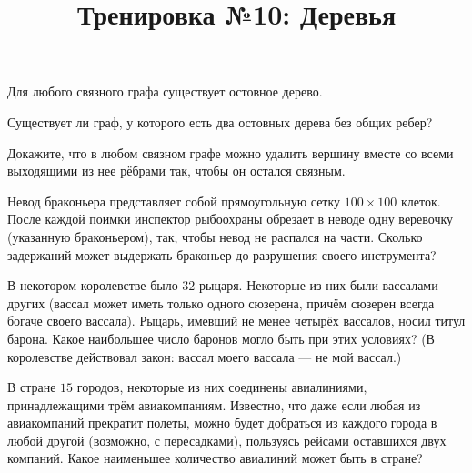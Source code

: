 



\title{Тренировка №10: Деревья}
\maketitle

\begin{problem}
	Для любого связного графа существует остовное дерево.
\end{problem}

\begin{problem}
	Существует ли граф, у которого есть два остовных дерева без общих ребер?
\end{problem}

\begin{problem}
	Докажите, что в любом связном графе можно удалить вершину вместе со всеми выходящими из нее рёбрами так, чтобы он остался связным.
\end{problem}

\begin{problem}
	Невод браконьера представляет собой прямоугольную сетку $100 \times 100$ клеток. После каждой поимки инспектор рыбоохраны обрезает в неводе одну веревочку (указанную браконьером), так, чтобы невод не распался на части. Сколько задержаний может выдержать браконьер до разрушения своего инструмента?
\end{problem}

\begin{problem}
	В некотором королевстве было $32$ рыцаря. Некоторые из них были вассалами других (вассал может иметь только одного сюзерена, причём сюзерен всегда богаче своего вассала). Рыцарь, имевший не менее четырёх вассалов, носил титул барона. Какое наибольшее число баронов могло быть при этих условиях? (В королевстве действовал закон: \guillemotleft вассал моего вассала --- не мой вассал\guillemotright.)
\end{problem}

\begin{problem}
	В стране $15$ городов, некоторые из них соединены авиалиниями, принадлежащими трём авиакомпаниям. Известно, что даже если любая из авиакомпаний прекратит полеты, можно будет добраться из каждого города в любой другой (возможно, с пересадками), пользуясь рейсами оставшихся двух компаний. Какое наименьшее количество авиалиний может быть в стране?
\end{problem}

